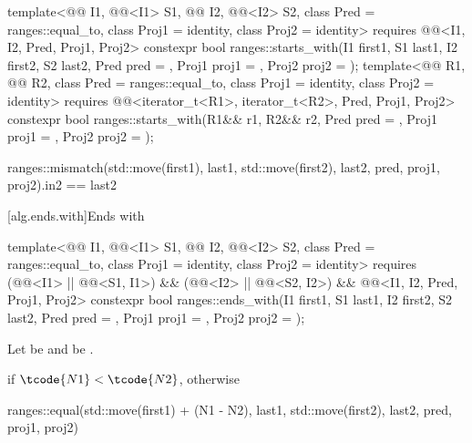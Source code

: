 %
\begin{itemdecl}
template<@@ I1, @@<I1> S1, @@ I2, @@<I2> S2,
         class Pred = ranges::equal_to, class Proj1 = identity, class Proj2 = identity>
  requires @@<I1, I2, Pred, Proj1, Proj2>
  constexpr bool ranges::starts_with(I1 first1, S1 last1, I2 first2, S2 last2, Pred pred = {},
                                     Proj1 proj1 = {}, Proj2 proj2 = {});
template<@@ R1, @@ R2, class Pred = ranges::equal_to, class Proj1 = identity,
         class Proj2 = identity>
  requires @@<iterator_t<R1>, iterator_t<R2>, Pred, Proj1, Proj2>
  constexpr bool ranges::starts_with(R1&& r1, R2&& r2, Pred pred = {},
                                     Proj1 proj1 = {}, Proj2 proj2 = {});
\end{itemdecl}

\begin{itemdescr}
\pnum
\returns
\begin{codeblock}
ranges::mismatch(std::move(first1), last1, std::move(first2), last2,
                 pred, proj1, proj2).in2 == last2
\end{codeblock}
\end{itemdescr}

[alg.ends.with]{Ends with}

%
\begin{itemdecl}
template<@@ I1, @@<I1> S1, @@ I2, @@<I2> S2,
         class Pred = ranges::equal_to, class Proj1 = identity, class Proj2 = identity>
  requires (@@<I1> || @@<S1, I1>) &&
           (@@<I2> || @@<S2, I2>) &&
           @@<I1, I2, Pred, Proj1, Proj2>
  constexpr bool ranges::ends_with(I1 first1, S1 last1, I2 first2, S2 last2, Pred pred = {},
                                   Proj1 proj1 = {}, Proj2 proj2 = {});
\end{itemdecl}

\begin{itemdescr}
\pnum
Let  be  and
 be .

\pnum
\returns
{} if $\tcode{N1} < \tcode{N2}$, otherwise
\begin{codeblock}
ranges::equal(std::move(first1) + (N1 - N2), last1, std::move(first2), last2,
              pred, proj1, proj2)
\end{codeblock}
\end{itemdescr}

